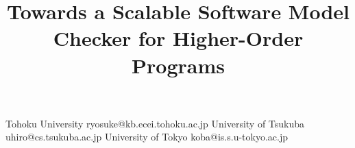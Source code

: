 \documentclass[preprint,nocopyrightspace]{sigplanconf}
\begin{document}
\copyrightdata{[to be supplied]}

\title{Towards a Scalable Software Model Checker for Higher-Order Programs}

           {Tohoku University}
           {ryosuke@kb.ecei.tohoku.ac.jp}
           {University of Tsukuba}
           {uhiro@cs.tsukuba.ac.jp}
           {University of Tokyo}
           {koba@is.s.u-tokyo.ac.jp}

\maketitle



%
%


%










\vspace{-5pt}




%
\end{document}
